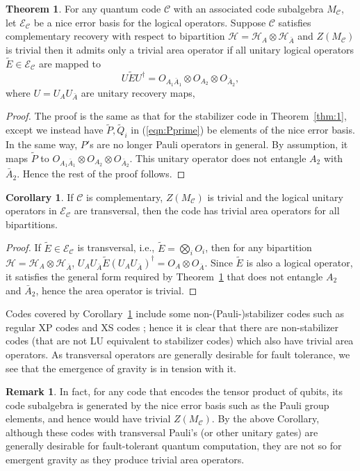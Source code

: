 \documentclass[a4paper,11pt]{article}
\theoremstyle{definition}
\newtheorem{theorem}{Theorem}[section]
\newtheorem{remark}{Remark}[section]
\newtheorem{corollary}{Corollary}[section]
\numberwithin{equation}{section}
\begin{document}
\begin{theorem}\label{thm:2}
    For any quantum code $\mathcal{C}$ with an associated code subalgebra $M_{\mathcal{C}}$, let  $\mathcal{E}_{\mathcal{C}}$ be a nice error basis for the logical operators. Suppose $\mathcal{C}$ satisfies complementary recovery with respect to bipartition $\mathcal{H}=\mathcal{H}_A\otimes\mathcal{H}_{\bar{A}}$ and $Z(M_{\mathcal{C}})$ is trivial then it admits only a trivial area operator if all unitary logical operators $\tilde{E}\in\mathcal{E}_\mathcal{C}$ are mapped to 
$$U\tilde{E}U^{\dagger}=O_{A_1\bar{A}_1}\otimes O_{A_2}\otimes O_{\bar{A}_2},$$
where $U=U_AU_{\bar{A}}$ are unitary recovery maps, 
\end{theorem}


\begin{proof}
The proof is the same as that for the stabilizer code in Theorem~\ref{thm:1}, except we instead have $\tilde{P},\tilde{Q}_i$ in (\ref{eqn:Pprime}) be elements of the nice error basis. In the same way, $P'$s are no longer Pauli operators in general. By assumption, it maps $\tilde{P}$ to $O_{A_1\bar{A}_1}\otimes O_{A_2}\otimes O_{\bar{A}_2}$. This unitary operator does not entangle $A_2$ with $\bar{A}_2$. Hence the rest of the proof follows.  
\end{proof}

\begin{corollary}\label{coro:2}
If $\mathcal{C}$ is complementary, $Z(M_{\mathcal{C}})$ is trivial and the logical unitary operators in $\mathcal{E}_{\mathcal{C}}$ are transversal, then the code has trivial area operators for all bipartitions.
\end{corollary}
\begin{proof}
    If $\tilde{E}\in\mathcal{E}_{\mathcal{C}}$ is transversal, i.e., $\tilde{E}=\bigotimes_i O_i$, then for any bipartition $\mathcal{H}=\mathcal{H}_A\otimes \mathcal{H}_{\bar{A}}$, $U_{A}U_{\bar{A}} \tilde{E} (U_{A}U_{\bar{A}})^{\dagger} = O_{A}\otimes O_{\bar{A}}$. Since $\tilde{E}$ is also a logical operator, it satisfies the general form required by Theorem~\ref{thm:2} that does not entangle $A_2$ and $\bar{A}_2$, hence the area operator is trivial. %
\end{proof}
Codes covered by Corollary~\ref{coro:2} include some non-(Pauli-)stabilizer codes such as regular XP codes and XS codes \cite{XP,XS}; hence it is clear that there are non-stabilizer codes (that are not LU equivalent to stabilizer codes) which also have trivial area operators.  As transversal operators are generally desirable for fault tolerance, we see that the emergence of gravity is in tension with it. 
\begin{remark}
    In fact, for any code that encodes the tensor product of qubits, its code subalgebra is generated by the nice error basis such as the Pauli group elements, and hence would have trivial $Z(M_{\mathcal{C}})$. By the above Corollary, although these codes with transversal Pauli's (or other unitary gates) are generally desirable for fault-tolerant quantum computation, they are not so for emergent gravity as they produce trivial area operators.
\end{remark}
\end{document}
